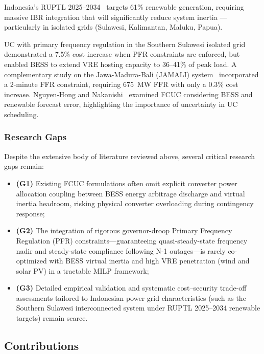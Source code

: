 \documentclass[journal]{IEEEtran}
\begin{document}
Indonesia's RUPTL 2025--2034~\cite{PLN2025} targets 61\%
renewable generation, requiring massive IBR integration that will
significantly reduce system inertia --- particularly in isolated
grids (Sulawesi, Kalimantan, Maluku, Papua).

UC with primary frequency regulation in the Southern Sulawesi
isolated grid~\cite{E02Sulawesi} demonstrated a 7.5\% cost
increase when PFR constraints are enforced, but enabled BESS to
extend VRE hosting capacity to 36--41\% of peak load.
A complementary study on the Jawa-Madura-Bali (JAMALI)
system~\cite{E03JAMALI} incorporated a 2-minute FFR constraint,
requiring 675~MW FFR with only a 0.3\% cost increase.
Nguyen-Hong and Nakanishi~\cite{D02ForecastError} examined FCUC
considering BESS and renewable forecast error, highlighting the
importance of uncertainty in UC scheduling.

\subsubsection{Research Gaps}

Despite the extensive body of literature reviewed above, several
critical research gaps remain:
\begin{itemize}
  \item \textbf{(G1)} Existing FCUC formulations often omit explicit
    converter power allocation coupling between BESS energy arbitrage
    discharge and virtual inertia headroom, risking physical converter
    overloading during contingency response;
  \item \textbf{(G2)} The integration of rigorous governor-droop
    Primary Frequency Regulation (PFR) constraints---guaranteeing
    quasi-steady-state frequency nadir and steady-state compliance
    following N-1 outages---is rarely co-optimized with BESS virtual
    inertia and high VRE penetration (wind and solar PV) in a tractable
    MILP framework;
  \item \textbf{(G3)} Detailed empirical validation and systematic
    cost--security trade-off assessments tailored to Indonesian power
    grid characteristics (such as the Southern Sulawesi interconnected
    system under RUPTL 2025--2034 renewable targets) remain scarce.
\end{itemize}

\subsection{Contributions}
\end{document}
